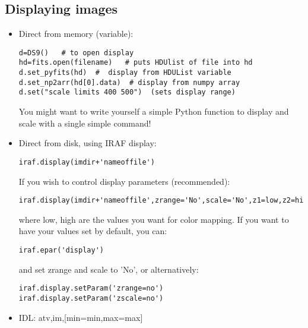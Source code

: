 \documentclass[12pt]{article}
\begin{document}
\subsection*{Displaying images}
\begin{itemize}
\item Direct from memory (variable):
\begin{verbatim}
d=DS9()   # to open display
hd=fits.open(filename)   # puts HDUlist of file into hd
d.set_pyfits(hd)  #  display from HDUList variable
d.set_np2arr(hd[0].data)  # display from numpy array
d.set("scale limits 400 500")  (sets display range)
\end{verbatim}
You might want to write yourself a simple Python function to display
and scale with a single simple command!
\item Direct from disk, using IRAF display:
\begin{verbatim}
iraf.display(imdir+'nameoffile')
\end{verbatim}
If you wish to control display parameters (recommended):
\begin{verbatim}
iraf.display(imdir+'nameoffile',zrange='No',scale='No',z1=low,z2=high)
\end{verbatim}
where low, high are the values you want for color mapping. If you want
to have your values set by default, you can:
\begin{verbatim}
iraf.epar('display')
\end{verbatim}
and set zrange and scale to 'No', or alternatively:
\begin{verbatim}
iraf.display.setParam('zrange=no')
iraf.display.setParam('zscale=no')
\end{verbatim}
\item IDL: atv,im,[min=min,max=max]
\end{itemize}
\end{document}
